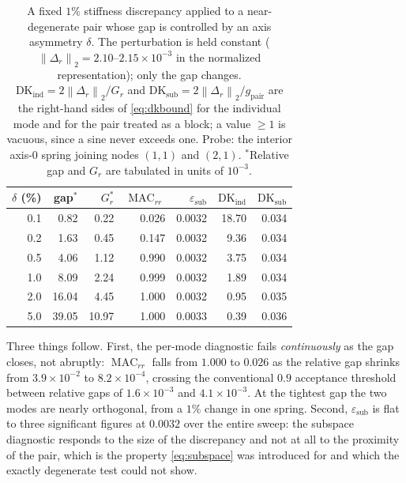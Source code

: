 \documentclass{ieeeaccess}
\newcommand{\norm}[1]{\left\lVert #1\right\rVert}
\newcommand{\MAC}{\operatorname{MAC}}
\begin{document}
\begin{table}[t]
\centering
\caption{A fixed $1\%$ stiffness discrepancy applied to a near-degenerate pair whose gap is
controlled by an axis asymmetry $\delta$. The perturbation is held constant
($\norm{\Delta_r}_2=2.10$--$2.15\times10^{-3}$ in the normalized representation); only the gap
changes. $\mathrm{DK}_{\mathrm{ind}}=2\norm{\Delta_r}_2/G_r$ and
$\mathrm{DK}_{\mathrm{sub}}=2\norm{\Delta_r}_2/g_{\mathrm{pair}}$ are the right-hand sides of
\cref{eq:dkbound} for the individual mode and for the pair treated as a block; a value
$\ge1$ is vacuous, since a sine never exceeds one. Probe: the interior axis-0 spring joining
nodes $(1,1)$ and $(2,1)$. $^{\ast}$Relative gap and $G_r$ are tabulated in units of
$10^{-3}$.}
\label{tab:neardeg}
\small
\setlength{\tabcolsep}{4pt}
\begin{tabular}{rrrrrrr}
\toprule
$\delta$ (\%) & gap$^{\ast}$ & $G_r^{\ast}$ & $\MAC_{rr}$ & $\varepsilon_{\mathrm{sub}}$
& $\mathrm{DK}_{\mathrm{ind}}$ & $\mathrm{DK}_{\mathrm{sub}}$\\
\midrule
0.1 & 0.82  & 0.22  & 0.026 & 0.0032 & 18.70 & 0.034\\
0.2 & 1.63  & 0.45  & 0.147 & 0.0032 & 9.36  & 0.034\\
0.5 & 4.06  & 1.12  & 0.990 & 0.0032 & 3.75  & 0.034\\
1.0 & 8.09  & 2.24  & 0.999 & 0.0032 & 1.89  & 0.034\\
2.0 & 16.04 & 4.45  & 1.000 & 0.0032 & 0.95  & 0.035\\
5.0 & 39.05 & 10.97 & 1.000 & 0.0033 & 0.39  & 0.036\\
\bottomrule
\end{tabular}
\end{table}

Three things follow. First, the per-mode diagnostic fails \emph{continuously} as the gap
closes, not abruptly: $\MAC_{rr}$ falls from $1.000$ to $0.026$ as the relative gap shrinks
from $3.9\times10^{-2}$ to $8.2\times10^{-4}$, crossing the conventional $0.9$ acceptance
threshold between relative gaps of $1.6\times10^{-3}$ and $4.1\times10^{-3}$. At the tightest
gap the two modes are nearly orthogonal, from a $1\%$ change in one spring. Second,
$\varepsilon_{\mathrm{sub}}$ is flat to three significant figures at $0.0032$ over the entire
sweep: the subspace diagnostic responds to the size of the discrepancy and not at all to the
proximity of the pair, which is the property \cref{eq:subspace} was introduced for and which
the exactly degenerate test could not show.
\end{document}
